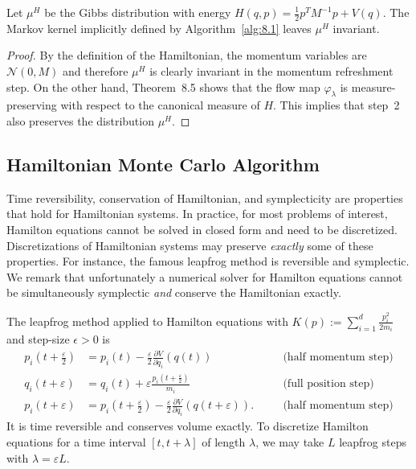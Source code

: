 \begin{theorem}
\label{thm:8.10}
Let $\mu^H$ be the Gibbs distribution with energy $H(q,p) = \frac{1}{2}p^T M^{-1}p + V(q)$.
The Markov kernel implicitly defined by Algorithm~\ref{alg:8.1} leaves $\mu^H$ invariant.
\end{theorem}

\begin{proof}
By the definition of the Hamiltonian, the momentum variables are $\mathcal{N}(0,M)$ and
therefore $\mu^H$ is clearly invariant in the momentum refreshment step. On the other hand,
Theorem~8.5 shows that the flow map $\varphi_\lambda$ is measure-preserving with respect to
the canonical measure of $H$. This implies that step~2 also preserves the distribution $\mu^H$.
\end{proof}

\subsection{Hamiltonian Monte Carlo Algorithm}
\label{sec:8.2.2}

Time reversibility, conservation of Hamiltonian, and symplecticity are properties that hold for
Hamiltonian systems. In practice, for most problems of interest, Hamilton equations cannot be
solved in closed form and need to be discretized. Discretizations of Hamiltonian systems may
preserve \emph{exactly} some of these properties. For instance, the famous leapfrog method is
reversible and symplectic. We remark that unfortunately a numerical solver for Hamilton
equations cannot be simultaneously symplectic \emph{and} conserve the Hamiltonian exactly.

\begin{example}
\label{ex:8.11}
The leapfrog method applied to Hamilton equations with
$K(p) := \sum_{i=1}^d \frac{p_i^2}{2m_i}$ and step-size $\epsilon > 0$ is
\begin{align*}
p_i\!\left(t + \tfrac{\varepsilon}{2}\right)
  &= p_i(t) - \frac{\varepsilon}{2}\frac{\partial V}{\partial q_i}(q(t))
  &\quad&\text{(half momentum step)} \\[4pt]
q_i(t + \varepsilon)
  &= q_i(t) + \varepsilon \frac{p_i\!\left(t + \frac{\varepsilon}{2}\right)}{m_i}
  &\quad&\text{(full position step)} \\[4pt]
p_i(t + \varepsilon)
  &= p_i\!\left(t + \tfrac{\varepsilon}{2}\right)
    - \frac{\varepsilon}{2}\frac{\partial V}{\partial q_i}(q(t+\varepsilon)).
  &\quad&\text{(half momentum step)}
\end{align*}
It is time reversible and conserves volume exactly. To discretize Hamilton equations for a time
interval $[t, t+\lambda]$ of length $\lambda$, we may take $L$ leapfrog steps with
$\lambda = \varepsilon L$.
\end{example}

